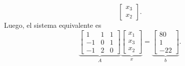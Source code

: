 \begin{frame}
\begin{solution}
\begin{enumerate}[a)]
\begin{equation*}
\begin{bmatrix}
					      x_{3} \\
					      x_{2}
				      \end{bmatrix}.
			      \end{equation*}
			      Luego, el sistema equivalente es
			      \begin{equation*}
				      \underbrace{
					      \begin{bmatrix}
						      1  & 1 & 1 \\
						      -1 & 0 & 1 \\
						      -1 & 2 & 0
					      \end{bmatrix}
				      }_{\displaystyle A}
				      \underbrace{
					      \begin{bmatrix}
						      x_{1} \\
						      x_{3} \\
						      x_{2}
					      \end{bmatrix}
				      }_{\displaystyle x}
				      =
				      \underbrace{
					      \begin{bmatrix}
						      80 \\
						      1  \\
						      -22
					      \end{bmatrix}
				      }_{\displaystyle b}.
			      \end{equation*}
		\end{enumerate}
	\end{solution}
\end{frame}


